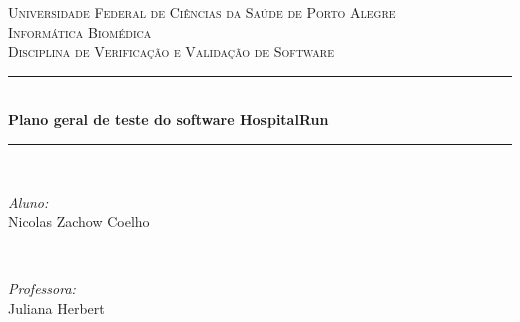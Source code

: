 \begin{titlepage}

\newcommand{\HRule}{\rule{\linewidth}{0.5mm}} %

\center %
 

\textsc{\LARGE Universidade Federal de Ciências da Saúde de Porto Alegre}\\[1.5cm] %
\textsc{\Large Informática Biomédica }\\[0.5cm] %
\textsc{\large Disciplina de Verificação e Validação de Software}\\[0.5cm] %


\HRule \\[0.4cm]
{ \huge \bfseries Plano geral de teste do software HospitalRun}\\[0.4cm] %
\HRule \\[1.5cm]
 

\begin{minipage}{0.4\textwidth}
\begin{flushleft} \large
\emph{Aluno:}\\
Nicolas Zachow Coelho
\end{flushleft}
\end{minipage}
~
\begin{minipage}{0.4\textwidth}
\begin{flushright} \large
\emph{Professora:} \\
Juliana Herbert
\end{flushright}
\end{minipage}\\[2cm]



\end{titlepage}
